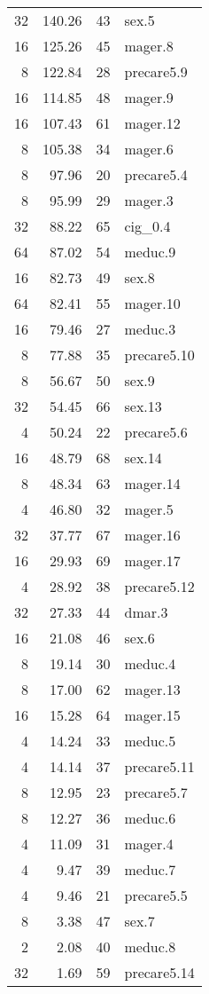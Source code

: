 \begin{longtable}{rrrp{3cm}}
32 & 140.26 & 43 & sex.5 \\
16 & 125.26 & 45 & mager.8 \\
8 & 122.84 & 28 & precare5.9 \\
16 & 114.85 & 48 & mager.9 \\
16 & 107.43 & 61 & mager.12 \\
8 & 105.38 & 34 & mager.6 \\
8 & 97.96 & 20 & precare5.4 \\
8 & 95.99 & 29 & mager.3 \\
32 & 88.22 & 65 & cig_0.4 \\
64 & 87.02 & 54 & meduc.9 \\
16 & 82.73 & 49 & sex.8 \\
64 & 82.41 & 55 & mager.10 \\
16 & 79.46 & 27 & meduc.3 \\
8 & 77.88 & 35 & precare5.10 \\
8 & 56.67 & 50 & sex.9 \\
32 & 54.45 & 66 & sex.13 \\
4 & 50.24 & 22 & precare5.6 \\
16 & 48.79 & 68 & sex.14 \\
8 & 48.34 & 63 & mager.14 \\
4 & 46.80 & 32 & mager.5 \\
32 & 37.77 & 67 & mager.16 \\
16 & 29.93 & 69 & mager.17 \\
4 & 28.92 & 38 & precare5.12 \\
32 & 27.33 & 44 & dmar.3 \\
16 & 21.08 & 46 & sex.6 \\
8 & 19.14 & 30 & meduc.4 \\
8 & 17.00 & 62 & mager.13 \\
16 & 15.28 & 64 & mager.15 \\
4 & 14.24 & 33 & meduc.5 \\
4 & 14.14 & 37 & precare5.11 \\
8 & 12.95 & 23 & precare5.7 \\
8 & 12.27 & 36 & meduc.6 \\
4 & 11.09 & 31 & mager.4 \\
4 & 9.47 & 39 & meduc.7 \\
4 & 9.46 & 21 & precare5.5 \\
8 & 3.38 & 47 & sex.7 \\
2 & 2.08 & 40 & meduc.8 \\
32 & 1.69 & 59 & precare5.14 \\
\hline
\end{longtable}
\endgroup
